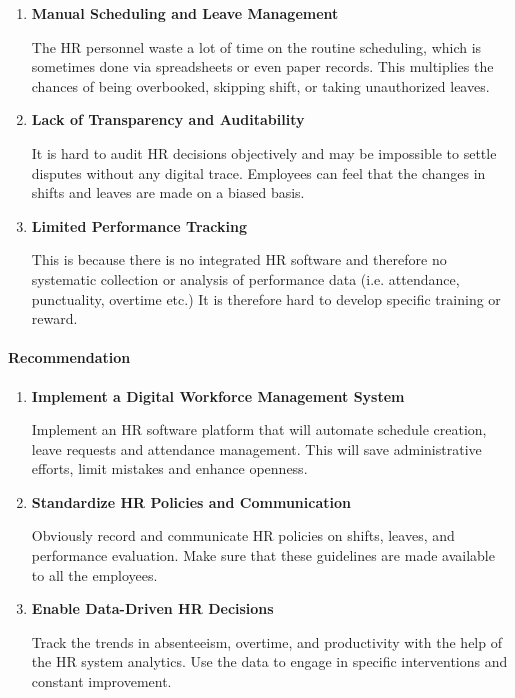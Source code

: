 \documentclass[12pt,a4paper]{article}
\begin{document}
\begin{enumerate}
    \item \textbf{Manual Scheduling and Leave Management}
    
    The HR personnel waste a lot of time on the routine scheduling, which is sometimes done via spreadsheets or even paper records. This multiplies the chances of being overbooked, skipping shift, or taking unauthorized leaves.
    
    \item \textbf{Lack of Transparency and Auditability}
    
    It is hard to audit HR decisions objectively and may be impossible to settle disputes without any digital trace. Employees can feel that the changes in shifts and leaves are made on a biased basis.
    
    \item \textbf{Limited Performance Tracking}
    
    This is because there is no integrated HR software and therefore no systematic collection or analysis of performance data (i.e. attendance, punctuality, overtime etc.) It is therefore hard to develop specific training or reward.
\end{enumerate}

\paragraph{Recommendation}

\begin{enumerate}
    \item \textbf{Implement a Digital Workforce Management System}
    
    Implement an HR software platform that will automate schedule creation, leave requests and attendance management. This will save administrative efforts, limit mistakes and enhance openness.
    
    \item \textbf{Standardize HR Policies and Communication}
    
    Obviously record and communicate HR policies on shifts, leaves, and performance evaluation. Make sure that these guidelines are made available to all the employees.
    
    \item \textbf{Enable Data-Driven HR Decisions}
    
    Track the trends in absenteeism, overtime, and productivity with the help of the HR system analytics. Use the data to engage in specific interventions and constant improvement.
\end{enumerate}
\end{document}
